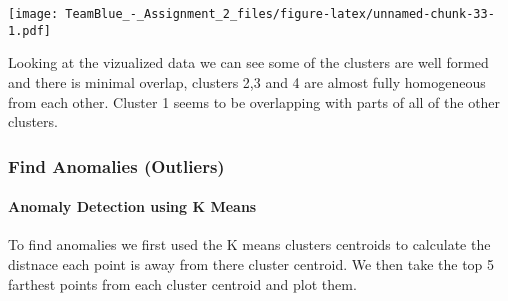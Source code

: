\documentclass[]{article}
\let\oldparagraph\paragraph
\renewcommand{\paragraph}[1]{\oldparagraph{#1}\mbox{}}
\begin{document}
\texttt{[image: TeamBlue\_-\_Assignment\_2\_files/figure-latex/unnamed-chunk-33-1.pdf]}

Looking at the vizualized data we can see some of the clusters are well
formed and there is minimal overlap, clusters 2,3 and 4 are almost fully
homogeneous from each other. Cluster 1 seems to be overlapping with
parts of all of the other clusters.

\subsubsection{Find Anomalies (Outliers)}\label{find-anomalies-outliers}

\paragraph{Anomaly Detection using K
Means}\label{anomaly-detection-using-k-means}

To find anomalies we first used the K means clusters centroids to
calculate the distnace each point is away from there cluster centroid.
We then take the top 5 farthest points from each cluster centroid and
plot them.
\end{document}
